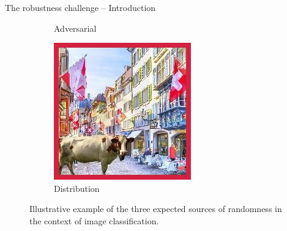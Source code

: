 \begin{frame}{The robustness challenge -- Introduction}
\begin{figure}
\begin{subfigure}[b]{0.22\textwidth}
			\caption{Adversarial}
		\end{subfigure}
		\hfill
		\begin{subfigure}[b]{0.22\textwidth}
			\centering
			\includegraphics[width=\textwidth]{img/introduction/cow_ood.jpg}
			\caption{Distribution}
		\end{subfigure}
		   \caption{
			Illustrative example of the three expected sources of randomness in 
			the context of image classification. 
		   }
		   \label{fig:cows}
	\end{figure}
\end{frame}



